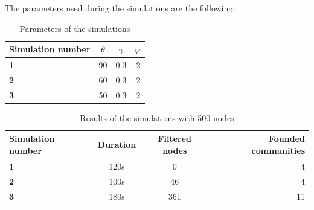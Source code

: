 \documentclass[12pt]{article}
\begin{document}
The parameters used during the simulations are the following:
\begin{table}[tbhp]
    \centering
    \begin{tabu}{|l|c|c|r|}
        \hline
        Simulation number & $\theta$ & $\gamma$  & $\varphi$  \\ \hline
        \textbf{1}    & 90  & 0.3  & 2   \\ \hline
        \textbf{2}    & 60  & 0.3  & 2   \\ \hline
        \textbf{3}    & 50  & 0.3  & 2   \\ \hline


  \end{tabu}                                                                                        \label{tab:parameters2}
    \caption[A Table]{Parameters of the simulations}
\end{table}
\newpage
\begin{table}[H]
    \centering
    \begin{tabu}{|l|c|c|r|}
        \hline
        Simulation number & Duration & Filtered nodes  & Founded communities  \\ \hline
        \textbf{1}    & 120s  & 0  & 4   \\ \hline
        \textbf{2}    & 100s  & 46  & 4   \\ \hline
        \textbf{3}    & 180s  & 361  & 11    \\ \hline  \end{tabu}
    \caption{Results of the simulations with 500 nodes}
    \label{tab:result2}
\end{table}
\end{document}
